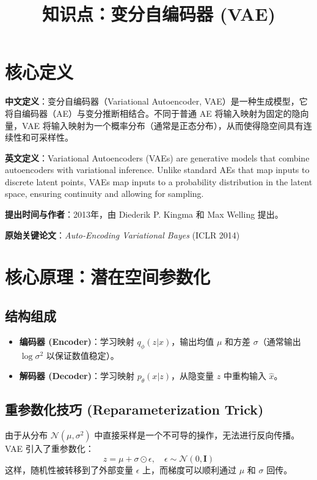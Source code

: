 \documentclass[12pt, a4paper]{article}
\title{知识点：变分自编码器 (VAE)}
\author{}
\date{}
\begin{document}
\maketitle

\section{核心定义}
\textbf{中文定义}：变分自编码器（Variational Autoencoder, VAE）是一种生成模型，它将自编码器（AE）与变分推断相结合。不同于普通 AE 将输入映射为固定的隐向量，VAE 将输入映射为一个概率分布（通常是正态分布），从而使得隐空间具有连续性和可采样性。

\textbf{英文定义}：Variational Autoencoders (VAEs) are generative models that combine autoencoders with variational inference. Unlike standard AEs that map inputs to discrete latent points, VAEs map inputs to a probability distribution in the latent space, ensuring continuity and allowing for sampling.

\textbf{提出时间与作者}：2013年，由 Diederik P. Kingma 和 Max Welling 提出。

\textbf{原始关键论文}：\textit{Auto-Encoding Variational Bayes} (ICLR 2014)

\section{核心原理：潜在空间参数化}

\subsection{结构组成}
\begin{itemize}
    \item \textbf{编码器 (Encoder)}：学习映射 $q_\phi(z|x)$，输出均值 $\mu$ 和方差 $\sigma$（通常输出 $\log \sigma^2$ 以保证数值稳定）。
    \item \textbf{解码器 (Decoder)}：学习映射 $p_\theta(x|z)$，从隐变量 $z$ 中重构输入 $\hat{x}$。
\end{itemize}

\subsection{重参数化技巧 (Reparameterization Trick)}
由于从分布 $\mathcal{N}(\mu, \sigma^2)$ 中直接采样是一个不可导的操作，无法进行反向传播。VAE 引入了重参数化：
$$ z = \mu + \sigma \odot \epsilon, \quad \epsilon \sim \mathcal{N}(0, \mathbf{I}) $$
这样，随机性被转移到了外部变量 $\epsilon$ 上，而梯度可以顺利通过 $\mu$ 和 $\sigma$ 回传。
\end{document}

